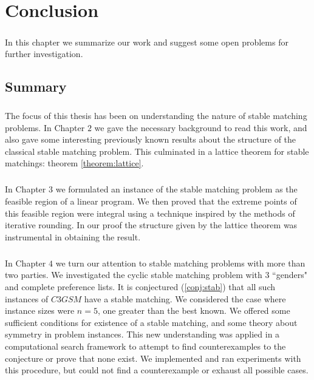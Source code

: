 \chapter{Conclusion}

\paragraph{}
In this chapter we summarize our work and suggest some open problems for further investigation.

\section{Summary}

\paragraph{}
The focus of this thesis has been on understanding the nature of stable matching problems. In Chapter $2$ we gave the necessary background to read this work, and also gave some interesting previously known results about the structure of the classical stable matching problem. This culminated in a lattice theorem for stable matchings: theorem \ref{theorem:lattice}. 
\paragraph{}
In Chapter $3$ we formulated an instance of the stable matching problem as the feasible region of a linear program. We then proved that the extreme points of this feasible region were integral using a technique inspired by the methods of iterative rounding. In our proof the structure given by the lattice theorem was instrumental in obtaining the result.
\paragraph{}
In Chapter $4$ we turn our attention to stable matching problems with more than two parties. We investigated the cyclic stable matching problem with $3$ ``genders" and complete preference lists. It is conjectured (\ref{conj:stab}) that all such instances of $C3GSM$ have a stable matching. We considered the case where instance sizes were $n=5$, one greater than the best known. We offered some sufficient conditions for existence of a stable matching, and some theory about symmetry in problem instances. This new understanding was applied in a computational search framework to attempt to find counterexamples to the conjecture or prove that none exist. We implemented and ran experiments with this procedure, but could not find a counterexample or exhaust all possible cases. 

